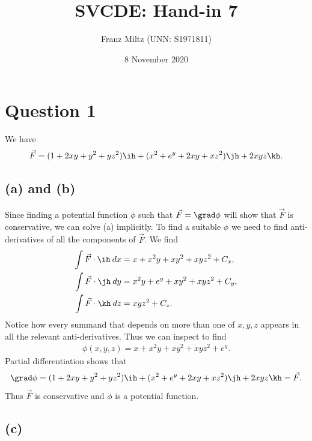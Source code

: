 \documentclass{article}
\begin{document}
\title{SVCDE: Hand-in 7}
\author{Franz Miltz (UNN: S1971811)}
\date{8 November 2020}
\maketitle


\section*{Question 1}


We have
\begin{align*}
  \vec F = (1+2xy+y^2+yz^2)\ih + (x^2+e^y+2xy+xz^2)\jh + 2xyz\kh.
\end{align*}

\subsection*{(a) and (b)}

Since finding a potential function $\phi$ such that $\vec F = \grad\phi$
will show that $\vec F$ is conservative, we can solve (a) implicitly.
To find a suitable $\phi$ we need to find anti-derivatives of all the components
of $\vec F$. We find
\begin{align*}
  \int \vec F\cdot \ih\: dx & = x + x^2y + xy^2 + xyz^2 + C_x, \\
  \int \vec F\cdot \jh\: dy & = x^2y+e^y+xy^2+xyz^2+C_y,       \\
  \int \vec F\cdot \kh\: dz & = xyz^2 + C_z.
\end{align*}
Notice how every summand that depends on more than one of $x,y,z$ appears
in all the relevant anti-derivatives. Thus we can inspect to find
\begin{align}
  \label{eqphi}
  \phi(x,y,z) = x + x^2y + xy^2 + xyz^2 + e^y.
\end{align}
Partial differentiation shows that
\begin{align*}
  \grad \phi = (1+2xy+y^2+yz^2)\ih + (x^2+e^y+2xy+xz^2)\jh + 2xyz\kh = \vec F.
\end{align*}
Thus $\vec F$ is conservative and $\phi$ is a potential function.

\subsection*{(c)}
\end{document}
